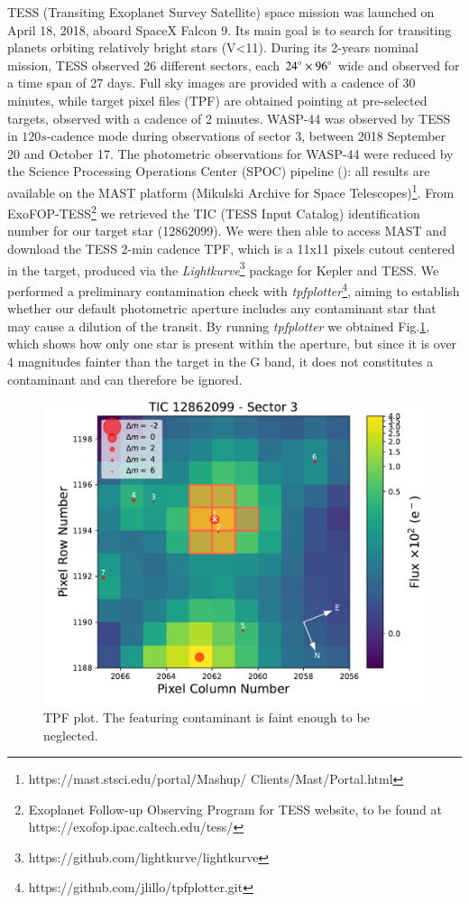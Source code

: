 \documentclass{aa}
\begin{document}
TESS (Transiting Exoplanet Survey Satellite) space mission was launched on April 18, 2018, aboard SpaceX Falcon 9. Its main goal is to search for transiting planets orbiting relatively bright stars (V<11). During its 2-years nominal mission, TESS observed 26 different sectors, each $24\degree \times 96\degree$ wide and observed for a time span of 27 days. Full sky images are provided with a cadence of 30 minutes, while target pixel files (TPF) are obtained pointing at pre-selected targets, observed with a cadence of 2 minutes.
WASP-44 was observed by TESS in $120 s$-cadence mode during observations of sector 3, between 2018 September 20 and October 17. The photometric observations for WASP-44 were reduced by the Science Processing Operations Center (SPOC) pipeline (\cite{Jenkins}):
all results are available on the MAST platform (Mikulski Archive for Space Telescopes)\footnote{https://mast.stsci.edu/portal/Mashup/ Clients/Mast/Portal.html}.
From ExoFOP-TESS\footnote{Exoplanet Follow-up Observing Program for TESS website, to be found at https://exofop.ipac.caltech.edu/tess/} we retrieved the TIC (TESS Input Catalog) identification number for our target star (12862099).
We were then able to access MAST and download the TESS 2-min cadence TPF, which is a 11x11 pixels cutout centered in the target, produced via the \textit{Lightkurve}\footnote{https://github.com/lightkurve/lightkurve} package for Kepler and TESS.
We performed a preliminary contamination check with \textit{tpfplotter}\footnote{https://github.com/jlillo/tpfplotter.git}, aiming to establish whether our default photometric aperture includes any contaminant star that may cause a dilution of the transit. By running \textit{tpfplotter} we obtained Fig.\ref{fig:tpfplot}, which shows how only one star is present within the aperture, but since it is over 4 magnitudes fainter than the target in the G band, it does not constitutes a contaminant and can therefore be ignored.
\begin{figure}[h]
    \centering
    \includegraphics[scale=0.4, angle=0]{pictures/TPF.pdf}
    \caption{TPF plot. The featuring contaminant is faint enough to be neglected.}
    \label{fig:tpfplot}
\end{figure}
\end{document}
